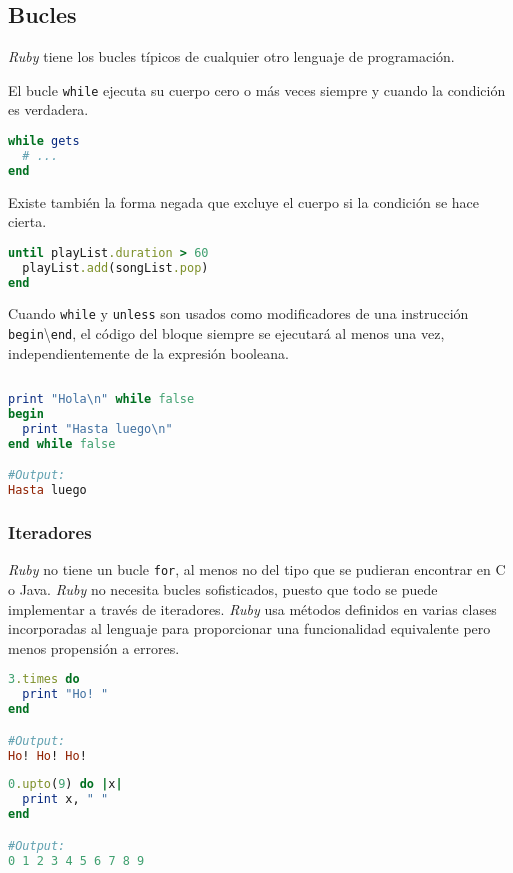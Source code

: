 \subsection{Bucles}
\textit{Ruby} tiene los bucles típicos de cualquier otro lenguaje de programación.

El bucle \texttt{while} ejecuta su cuerpo cero o más veces siempre y cuando la condición es verdadera.

\begin{lstlisting}[language=Ruby]
while gets
  # ...
end
\end{lstlisting}

Existe también la forma negada que excluye el cuerpo si la condición se hace cierta.

\begin{lstlisting}[language=Ruby]
until playList.duration > 60
  playList.add(songList.pop)
end
\end{lstlisting}

Cuando \texttt{while} y \texttt{unless} son usados como modificadores de una instrucción \texttt{begin}\textbackslash{}\texttt{end}, el código del bloque siempre se ejecutará al menos una vez, independientemente de la expresión booleana.

\begin{lstlisting}[language=Ruby]
 
print "Hola\n" while false
begin
  print "Hasta luego\n"
end while false

#Output:
Hasta luego
\end{lstlisting}

\subsubsection{Iteradores}
\textit{Ruby} no tiene un bucle \texttt{for}, al menos no del tipo que se pudieran encontrar en C o Java. \textit{Ruby} no necesita bucles sofisticados, puesto que todo se puede implementar a través de iteradores. \textit{Ruby} usa métodos definidos en varias clases incorporadas al lenguaje para proporcionar una funcionalidad equivalente pero menos propensión a errores.

\begin{lstlisting}[language=Ruby]
3.times do
  print "Ho! "
end

#Output:
Ho! Ho! Ho!
\end{lstlisting}

\begin{lstlisting}[language=Ruby]
0.upto(9) do |x|
  print x, " "
end

#Output:
0 1 2 3 4 5 6 7 8 9
\end{lstlisting}

